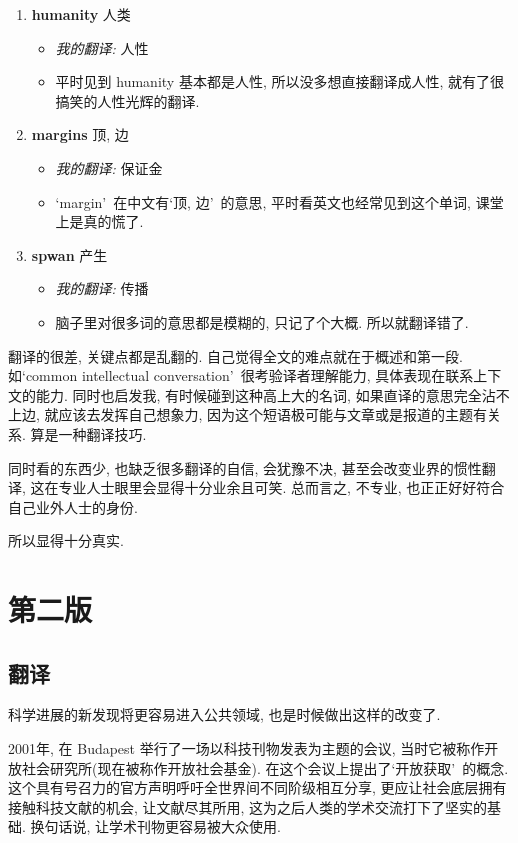 \documentclass[a4paper, 12pt, UTF8]{article}
\begin{document}
\begin{enumerate}[\hspace{0.5cm} 1.]
    \item {\bfseries humanity} 人类
          \begin{itemize}
              \item \emph{我的翻译:} 人性
              \item 平时见到 humanity 基本都是人性, 所以没多想直接翻译成人性, 就有了很搞笑的人性光辉的翻译.
          \end{itemize}
    \item {\bfseries margins} 顶, 边
          \begin{itemize}
              \item \emph{我的翻译:} 保证金 
              \item \lq margin\rq\ 在中文有\lq 顶, 边\rq\ 的意思, 平时看英文也经常见到这个单词, 课堂上是真的慌了.
          \end{itemize}
    \item {\bfseries spwan} 产生
          \begin{itemize}
              \item \emph{我的翻译:} 传播
              \item 脑子里对很多词的意思都是模糊的, 只记了个大概. 所以就翻译错了.
          \end{itemize}
\end{enumerate}

翻译的很差, 关键点都是乱翻的. 自己觉得全文的难点就在于概述和第一段. 如\lq common intellectual conversation\rq\ 很考验译者理解能力, 具体表现在联系上下文的能力. 同时也启发我, 有时候碰到这种高上大的名词, 如果直译的意思完全沾不上边, 就应该去发挥自己想象力, 因为这个短语极可能与文章或是报道的主题有关系. 算是一种翻译技巧. 

同时看的东西少, 也缺乏很多翻译的自信, 会犹豫不决, 甚至会改变业界的惯性翻译, 这在专业人士眼里会显得十分业余且可笑. 总而言之, 不专业, 也正正好好符合自己业外人士的身份.

所以显得十分真实.

\newpage
\section{第二版}
\subsection{翻译}
科学进展的新发现将更容易进入公共领域, 也是时候做出这样的改变了.

2001年, 在 Budapest 举行了一场以科技刊物发表为主题的会议, 当时它被称作开放社会研究所(现在被称作开放社会基金). 在这个会议上提出了\lq 开放获取\rq\ 的概念. 这个具有号召力的官方声明呼吁全世界间不同阶级相互分享, 更应让社会底层拥有接触科技文献的机会, 让文献尽其所用, 这为之后人类的学术交流打下了坚实的基础. 换句话说, 让学术刊物更容易被大众使用.
\end{document}
